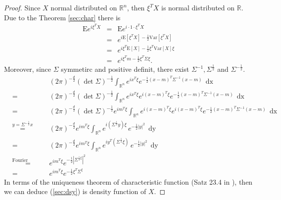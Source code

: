 \documentclass[a4paper, twoside, 11pt]{article}
\theoremstyle{definition}
\newcommand{\sqbr}[1]{\left[ {#1} \right]}
\begin{document}
\begin{proof}
  Since $X$ normal distributed on $\mathbb{R}^{n}$, then $\xi^T X$ is normal distributed on $\mathbb{R}$. Due to the Theorem \ref{sec:char} there is
  \begin{eqnarray*}
	\mathrm{E} e^{i\xi^T X} &=& \mathrm{E} e^{i\cdot 1 \cdot \xi^T X}\\
	                        &=& e^{i\mathrm{E}\sqbr{\xi^T X} -\frac{1}{2}\mathrm{Var}\sqbr{\xi^T X}}\\
							&=& e^{i\xi^T\mathrm{E}\sqbr{X} - \frac{1}{2}\xi^T \mathrm{Var}\sqbr{X} \xi}\\
						    &=& e^{i\xi^Tm - \frac{1}{2}\xi^T \Sigma \xi}.
  \end{eqnarray*}
  Moreover, since $\Sigma$ symmetirc and positive definit, there exist $\Sigma^{-1}, \Sigma^{\frac{1}{2}}$ and $\Sigma^{-\frac{1}{2}}$.
  \begin{eqnarray*}
	&&(2\pi)^{-\frac{d}{2}} (\det\Sigma) ^{-\frac{1}{2}}\int_{\mathbb{R}^{n}} e^{i x^T \xi}e^{-\frac{1}{2}(x-m)^T\Sigma^{-1}(x-m)}\, \mathop{dx}\\
	&=& (2\pi)^{-\frac{d}{2}} (\det\Sigma) ^{-\frac{1}{2}}\int_{\mathbb{R}^{n}} e^{ix^T\xi} e^{i (x-m)^T \xi}e^{-\frac{1}{2}(x-m)^T\Sigma^{-1}(x-m)}\, \mathop{dx} \\
	&=& (2\pi)^{-\frac{d}{2}} (\det\Sigma) ^{-\frac{1}{2}}  e^{im^T\xi} \int_{\mathbb{R}^{n}} e^{i(x-m)^T\xi} e^{i (x-m)^T \xi}e^{-\frac{1}{2}(x-m)^T\Sigma^{-1}(x-m)}\, \mathop{dx} \\
	&\overset{y=\Sigma^{-\frac{1}{2}}x}{=}& (2\pi)^{-\frac{d}{2}} e^{im^T\xi} \int_{\mathbb{R}^{n}}e^{i (\Sigma^{\frac{1}{2}}y) \xi}\,e^{-\frac{1}{2}|y|^2}\, \mathop{dy}\\
	&=& (2\pi)^{-\frac{d}{2}} e^{im^T\xi}  \int_{\mathbb{R}^{n}}e^{i y^T (\Sigma^{\frac{1}{2}}\xi)}\,e^{-\frac{1}{2}|y|^2}\, \mathop{dy}\\
	&\overset{\text{Fourier transformation}}{=}& e^{im^T\xi}  e^{-\frac{1}{2}|\Sigma^{\frac{1}{2}\xi}|^2}\\
	&=& e^{im^T\xi}  e^{-\frac{1}{2}\xi^T\Sigma^\xi}
  \end{eqnarray*}
  In terms of the uniqueness theorem of characteristic function (Satz 23.4 in \cite{bauer}), then we can deduce (\ref{sec:dsy}) is density function of $X$.
\end{proof}
\end{document}
